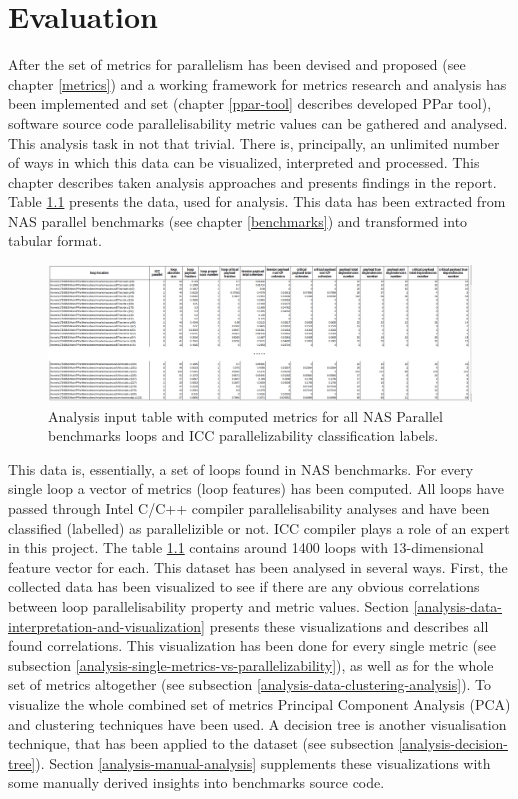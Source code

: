 \chapter{Evaluation}
\label{analysis}
\null\qquad After the set of metrics for parallelism has been devised and proposed (see chapter \ref{metrics}) and a working framework for metrics research and analysis has been implemented and set (chapter \ref{ppar-tool} describes developed PPar tool), software source code parallelisability metric values can be gathered and analysed. This analysis task in not that trivial. There is, principally, an unlimited number of ways in which this data can be visualized, interpreted and processed. This chapter describes taken analysis approaches and presents findings in the report.\newline
\null\qquad Table \ref{analysis-data-table} presents the data, used for analysis. This data has been extracted from NAS parallel benchmarks (see chapter \ref{benchmarks}) and transformed into tabular format.
\begin{figure}
\centering
\includegraphics[width=\linewidth]{figs/metrics-table.png}
\caption{Analysis input table with computed metrics for all NAS Parallel benchmarks loops and ICC parallelizability classification labels.}
\label{analysis-data-table}
\end{figure}
\null\qquad This data is, essentially, a set of loops found in NAS benchmarks. For every single loop a vector of metrics (loop features) has been computed. All loops have passed through Intel C/C++ compiler parallelisability analyses and have been classified (labelled) as parallelizible or not. ICC compiler plays a role of an expert in this project. The table \ref{analysis-data-table} contains around 1400 loops with 13-dimensional feature vector for each.\newline
\null\qquad This dataset has been analysed in several ways. First, the collected data has been visualized to see if there are any obvious correlations between loop parallelisability property and metric values. Section \ref{analysis-data-interpretation-and-visualization} presents these visualizations and describes all found correlations. This visualization has been done for every single metric (see subsection \ref{analysis-single-metrics-vs-parallelizability}), as well as for the whole set of metrics altogether (see subsection \ref{analysis-data-clustering-analysis}). To visualize the whole combined set of metrics Principal Component Analysis (PCA) and clustering techniques have been used. A decision tree is another visualisation technique, that has been applied to the dataset (see subsection \ref{analysis-decision-tree}). Section \ref{analysis-manual-analysis} supplements these visualizations with some manually derived insights into benchmarks source code.\newline
